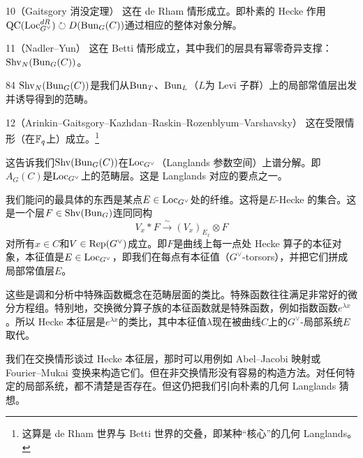 \begin{srcthm}{10（Gaitsgory 消没定理）}
这在 de Rham 情形成立。即朴素的 Hecke 作用
$\mathrm{QC}(\mathrm{Loc}^{dR}_{G^{\vee}})\circlearrowright D(\mathrm{Bun}_G(C))$通过相应的整体对象分解。
\end{srcthm}

\begin{srcthm}{11（Nadler–Yun）}
这在 Betti 情形成立，其中我们的层具有幂零奇异支撑：$\mathrm{Shv}_N(\mathrm{Bun}_G(C))$。
\end{srcthm}

\begin{srcrem}{84}
$\mathrm{Shv}_N(\mathrm{Bun}_G(C))$是我们从$\mathrm{Bun}_T$、$\mathrm{Bun}_L$（$L$为 Levi 子群）上的局部常值层出发并诱导得到的范畴。
\end{srcrem}

\begin{srcthm}{12（Arinkin–Gaitsgory–Kazhdan–Raskin–Rozenblyum–Varshavsky）}
这在受限情形（在$\mathbb{F}_q$上）成立。\footnote{这算是 de Rham 世界与 Betti 世界的交叠，即某种“核心”的几何 Langlands。}
\end{srcthm}

这告诉我们$\mathrm{Shv}(\mathrm{Bun}_G(C))$在$\mathrm{Loc}_{G^{\vee}}$（Langlands 参数空间）上谱分解。即$A_G(C)$是$\mathrm{Loc}_{G^{\vee}}$上的范畴层。这是 Langlands 对应的要点之一。

我们能问的最具体的东西是某点$E\in\mathrm{Loc}_{G^{\vee}}$处的纤维。这将是$E$-Hecke 的集合。这是一个层$F\in\mathrm{Shv}(\mathrm{Bun}_G)$连同同构
\begin{equation}\tag{11.151}
V_x*F\xrightarrow{\ \sim\ }(V_x)_{E_x}\otimes F
\end{equation}
对所有$x\in C$和$V\in\mathrm{Rep}(G^{\vee})$成立。即$F$是曲线上每一点处 Hecke 算子的本征对象，本征值是$E\in\mathrm{Loc}_{G^{\vee}}$，即我们在每点有本征值（$G^{\vee}$-torsors），并把它们拼成局部常值层$E$。

这些是调和分析中特殊函数概念在范畴层面的类比。特殊函数往往满足非常好的微分方程组。特别地，交换微分算子族的本征函数就是特殊函数，例如指数函数$e^{\lambda x}$。所以 Hecke 本征层是$e^{\lambda x}$的类比，其中本征值$\lambda$现在被曲线$C$上的$G^{\vee}$-局部系统$E$取代。

我们在交换情形谈过 Hecke 本征层，那时可以用例如 Abel–Jacobi 映射或 Fourier–Mukai 变换来构造它们。但在非交换情形没有容易的构造方法。对任何特定的局部系统，都不清楚是否存在。但这仍把我们引向朴素的几何 Langlands 猜想。


